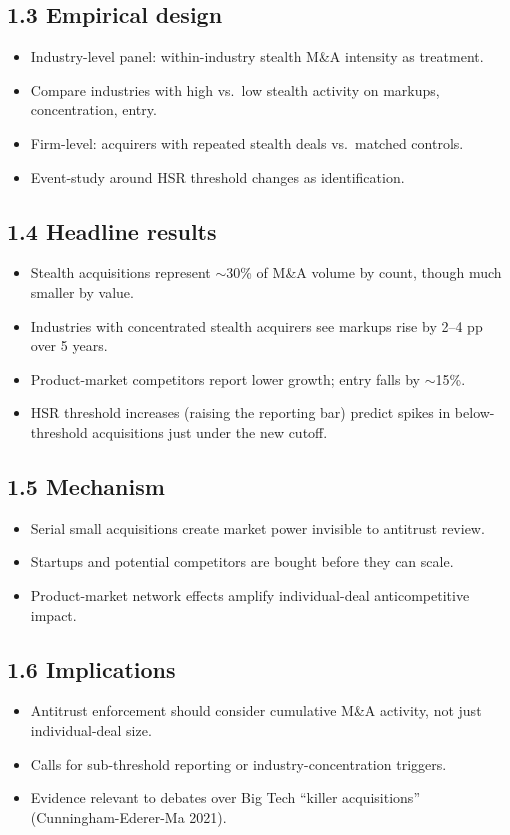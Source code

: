 \documentclass[11pt]{article}
\begin{document}
\subsection*{1.3 Empirical design}
\begin{itemize}
\item Industry-level panel: within-industry stealth M\&A intensity as treatment.
\item Compare industries with high vs.\ low stealth activity on markups, concentration, entry.
\item Firm-level: acquirers with repeated stealth deals vs.\ matched controls.
\item Event-study around HSR threshold changes as identification.
\end{itemize}

\subsection*{1.4 Headline results}
\begin{itemize}
\item Stealth acquisitions represent $\sim$30\% of M\&A volume by count, though much smaller by value.
\item Industries with concentrated stealth acquirers see markups rise by 2--4 pp over 5 years.
\item Product-market competitors report lower growth; entry falls by $\sim$15\%.
\item HSR threshold increases (raising the reporting bar) predict spikes in below-threshold acquisitions just under the new cutoff.
\end{itemize}

\subsection*{1.5 Mechanism}
\begin{itemize}
\item Serial small acquisitions create market power invisible to antitrust review.
\item Startups and potential competitors are bought before they can scale.
\item Product-market network effects amplify individual-deal anticompetitive impact.
\end{itemize}

\subsection*{1.6 Implications}
\begin{itemize}
\item Antitrust enforcement should consider cumulative M\&A activity, not just individual-deal size.
\item Calls for sub-threshold reporting or industry-concentration triggers.
\item Evidence relevant to debates over Big Tech ``killer acquisitions'' (Cunningham-Ederer-Ma 2021).
\end{itemize}
\end{document}
